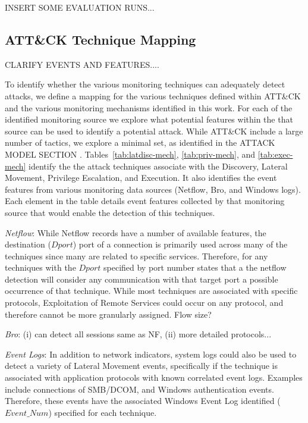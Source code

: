 \documentclass[journal]{IEEEtran}
\begin{document}
\color{red} INSERT SOME EVALUATION RUNS... \color{black}




\subsection{ATT\&CK Technique Mapping}

\color{red} CLARIFY EVENTS AND FEATURES.... \color{black}


To identify whether the various monitoring techniques can adequately detect attacks, we define a mapping for the various techniques defined within ATT\&CK and the various monitoring mechanisms identified in this work. For each of the identified monitoring source we explore what potential features within the that source can be used to identify a potential attack. While ATT\&CK include a large number of tactics, we explore a minimal set, as identified in the \color{red} ATTACK MODEL SECTION \color{black}. Tables~\ref{tab:latdisc-mech}, \ref{tab:priv-mech}, and \ref{tab:exec-mech} identify the the attack techniques associate with the Discovery, Lateral Movement, Privilege Escalation, and Execution. It also identifies the event features from various monitoring data sources (Netflow, Bro, and Windows logs).  Each element in the table details event features collected by that monitoring source that would enable the detection of this techniques. 

{\it Netflow}: While Netflow records have a number of available features, the destination ($Dport$) port of a connection is primarily used across many of the techniques since many are related to specific services. Therefore, for any techniques with the $Dport$ specified by port number states that a the netflow detection will consider any communication with that target port a possible occurrence of that technique. While most techniques are associated with specific protocols, Exploitation of Remote Services could occur on any protocol, and therefore cannot be more granularly assigned. \color{red} Flow size? \color{black}

\color{red} {\it Bro}: (i) can detect all sessions same as NF, (ii) more detailed protocols... \color{black}

{\it Event Logs}: In addition to network indicators, system logs could also be used to detect a variety of Lateral Movement events, specifically if the technique is associated with application protocols with known correlated event logs. Examples include connections of SMB/DCOM, and Windows authentication events. Therefore, these events have the associated Windows Event Log identified ($Event\_Num$) specified for each technique.
\end{document}
